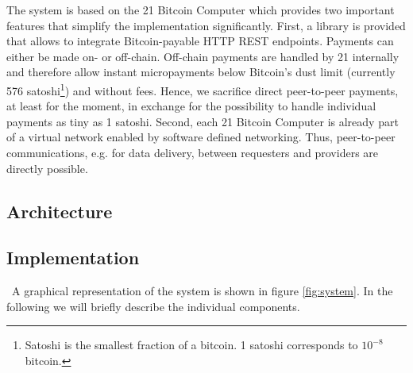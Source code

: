 The system is based on the 21 Bitcoin Computer which provides two important features that simplify the implementation significantly. First, a library is provided that allows to integrate Bitcoin-payable HTTP REST endpoints. Payments can either be made on- or off-chain. Off-chain payments are handled by 21 internally and therefore allow instant micropayments below Bitcoin's dust limit (currently 576 satoshi\footnote{Satoshi is the smallest fraction of a bitcoin. 1 satoshi corresponds to $10^{-8}$ bitcoin.}) and without fees. Hence, we sacrifice direct peer-to-peer payments, at least for the moment, in exchange for the possibility to handle individual payments as tiny as 1 satoshi. Second, each 21 Bitcoin Computer is already part of a virtual network enabled by software defined networking. Thus, peer-to-peer communications, e.g. for data delivery, between requesters and providers are directly possible. 

\subsection{Architecture}

\subsection{Implementation}


\
A graphical representation of the system is shown in figure \ref{fig:system}. In the following we will briefly describe the individual components.
